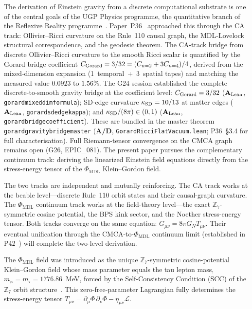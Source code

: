 \documentclass[11pt]{article}
\theoremstyle{remark}
\newcommand{\PHIMDL}{\Phi_{\mathrm{MDL}}}
\newcommand{\ZS}{\mathbb{Z}_7}
\newcommand{\lean}[1]{%
  \penalty-100
  \begingroup\def\_{\textunderscore\allowbreak}\texttt{#1}\endgroup}
\newcommand{\CatAL}{\ensuremath{\textbf{A}_{\rm Lean}}}
\newcommand{\CatAD}{\textbf{A/D}}
\newcommand{\Tmunu}{T_{\mu\nu}}
\newcommand{\Gmunu}{G_{\mu\nu}}
\newcommand{\GN}{G_N}
\begin{document}
The derivation of Einstein gravity from a discrete computational substrate is one
of the central goals of the UGP Physics programme, the quantitative branch of the
Reflexive Reality programme~\cite{SpivackResearchProgrammes}.
Paper~P36~\cite{SpivackEmergentGravity} approached this through the CA track:
Ollivier--Ricci curvature on the Rule~110 causal graph, the MDL-Lovelock structural
correspondence, and the geodesic theorem.
The CA-track bridge from discrete Ollivier--Ricci curvature to the smooth Ricci scalar
is quantified by the Gorard bridge coefficient
$C_{\rm Gorard} = 3/32 = (C_{n=2} + 3C_{n=4})/4$,
derived from the mixed-dimension expansion (1~temporal~+~3~spatial tapes) and
matching the measured value $0.0923$ to $1.56\%$.
The G24 session established the complete discrete-to-smooth gravity bridge at the
coefficient level: $C_{\rm Gorard} = 3/32$ (\CatAL,
\lean{gorard\_mixed\_dim\_formula}); SD-edge curvature $\kappa_{\rm SD} = 10/13$
at matter edges (\CatAL, \lean{gorard\_sd\_edge\_kappa}); and $\kappa_{\rm SD}/(8\pi)
\in (0,1)$ (\CatAL, \lean{gorard\_bridge\_coefficient}).  These are bundled in the
master theorem \lean{gorard\_gravity\_bridge\_master} (\CatAD,
\lean{GorardRicciFlatVacuum.lean}; P36~\S3.4 for full characterisation).
Full Riemann-tensor convergence on the CMCA graph remains open (G26, EPIC\_081).
The present paper pursues the complementary continuum track: deriving the linearized
Einstein field equations directly from the stress-energy tensor of the $\PHIMDL$
Klein--Gordon field.

The two tracks are independent and mutually reinforcing.
The CA track works at the beable level---discrete Rule~110 orbit states and their
causal-graph curvature.
The $\PHIMDL$ continuum track works at the field-theory level---the exact $\ZS$-symmetric
cosine potential, the BPS kink sector, and the Noether stress-energy tensor.
Both tracks converge on the same equation: $\Gmunu = 8\pi\GN\Tmunu$.
Their eventual unification through the CMCA-to-$\PHIMDL$ continuum limit
(established in P42~\cite{SpivackPhiMDLField}) will complete the two-level derivation.

The $\PHIMDL$ field was introduced as the unique $\ZS$-symmetric cosine-potential
Klein--Gordon field whose mass parameter equals the tau lepton mass,
$m_\varphi = m_\tau = 1776.86$~MeV, forced by the Self-Consistency Condition (SCC)
of the $\ZS$ orbit structure~\cite{SpivackGTEUnification}.
This zero-free-parameter Lagrangian fully determines the stress-energy tensor
$\Tmunu = \partial_\mu\Phi\,\partial_\nu\Phi - \eta_{\mu\nu}\mathcal{L}$.
\end{document}
